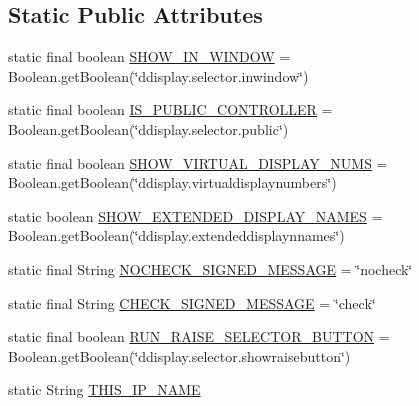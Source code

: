\subsection*{Static Public Attributes}
\begin{DoxyCompactItemize}
\item 
static final boolean \hyperlink{classgov_1_1fnal_1_1ppd_1_1dd_1_1GlobalVariables_af0e7b37c8bf6495b999b93ed0f4f1c76}{S\-H\-O\-W\-\_\-\-I\-N\-\_\-\-W\-I\-N\-D\-O\-W} = Boolean.\-get\-Boolean(\char`\"{}ddisplay.\-selector.\-inwindow\char`\"{})
\item 
static final boolean \hyperlink{classgov_1_1fnal_1_1ppd_1_1dd_1_1GlobalVariables_a01fec82f5b2996d3e0c41c1f52d884a0}{I\-S\-\_\-\-P\-U\-B\-L\-I\-C\-\_\-\-C\-O\-N\-T\-R\-O\-L\-L\-E\-R} = Boolean.\-get\-Boolean(\char`\"{}ddisplay.\-selector.\-public\char`\"{})
\item 
static final boolean \hyperlink{classgov_1_1fnal_1_1ppd_1_1dd_1_1GlobalVariables_a7ccfa5abda77efe03cd888f14d4171a3}{S\-H\-O\-W\-\_\-\-V\-I\-R\-T\-U\-A\-L\-\_\-\-D\-I\-S\-P\-L\-A\-Y\-\_\-\-N\-U\-M\-S} = Boolean.\-get\-Boolean(\char`\"{}ddisplay.\-virtualdisplaynumbers\char`\"{})
\item 
static boolean \hyperlink{classgov_1_1fnal_1_1ppd_1_1dd_1_1GlobalVariables_a24c624ba470a455c7ed0c43d72a9f417}{S\-H\-O\-W\-\_\-\-E\-X\-T\-E\-N\-D\-E\-D\-\_\-\-D\-I\-S\-P\-L\-A\-Y\-\_\-\-N\-A\-M\-E\-S} = Boolean.\-get\-Boolean(\char`\"{}ddisplay.\-extendeddisplaynnames\char`\"{})
\item 
static final String \hyperlink{classgov_1_1fnal_1_1ppd_1_1dd_1_1GlobalVariables_a83097f18e0ffe08a8a7ae97f883ee471}{N\-O\-C\-H\-E\-C\-K\-\_\-\-S\-I\-G\-N\-E\-D\-\_\-\-M\-E\-S\-S\-A\-G\-E} = \char`\"{}nocheck\char`\"{}
\item 
static final String \hyperlink{classgov_1_1fnal_1_1ppd_1_1dd_1_1GlobalVariables_a274f346ecbec974a9b47db2e5d1e0e8b}{C\-H\-E\-C\-K\-\_\-\-S\-I\-G\-N\-E\-D\-\_\-\-M\-E\-S\-S\-A\-G\-E} = \char`\"{}check\char`\"{}
\item 
static final boolean \hyperlink{classgov_1_1fnal_1_1ppd_1_1dd_1_1GlobalVariables_ab3d08672e81ebb3ed3cea10a5fcaf914}{R\-U\-N\-\_\-\-R\-A\-I\-S\-E\-\_\-\-S\-E\-L\-E\-C\-T\-O\-R\-\_\-\-B\-U\-T\-T\-O\-N} = Boolean.\-get\-Boolean(\char`\"{}ddisplay.\-selector.\-showraisebutton\char`\"{})
\item 
static String \hyperlink{classgov_1_1fnal_1_1ppd_1_1dd_1_1GlobalVariables_a35adf140ccbaaf275e34d1539424828a}{T\-H\-I\-S\-\_\-\-I\-P\-\_\-\-N\-A\-M\-E}
\item 

\end{DoxyCompactItemize}
